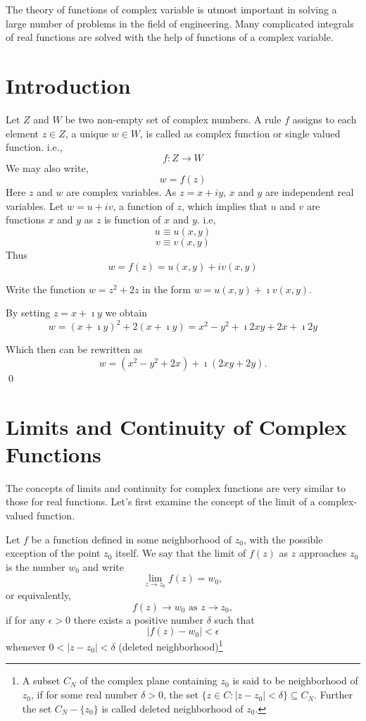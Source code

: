The theory of functions of complex variable is utmost important in solving a large number of problems in the field of engineering. Many complicated integrals of real functions are solved with the help of functions of a complex variable. 
\section{Introduction}
Let $Z$ and $W$ be two non-empty set of complex numbers. A rule $f$ assigns to each element $z \in Z$, a unique $w \in W$, is called as complex function or single valued function. i.e.,
\[f: Z \rightarrow W\]
We may also write,
\[w = f(z)\]
Here $z$ and $w$ are complex variables. As $z = x+iy$, $x$ and $y$ are independent real variables.
Let $w=u+iv$, a function of $z$, which implies that $u$ and $v$ are functions $x$ and $y$ as $z$ is  function of $x$ and $y$. i.e, 
\[ u \equiv u(x,y) \]
\[ v \equiv v(x,y) \]
Thus 
\[ w = f(z) = u(x,y)+iv(x,y) \]

\begin{example}
Write the function $w = z^2 + 2z$ in the form $w = u(x,y) + \imath v(x,y)$.

By setting $z = x + \imath y$ we obtain
\[w = (x + \imath y)^2 + 2(x + \imath y) = x^2-y^2 + \imath2xy + 2x + \imath2y\]

Which then can be rewritten as
\[w = (x^2 - y^2 + 2x) + \imath (2xy + 2y).\]
\qed
\end{example}



\section{Limits and Continuity of Complex Functions}

The concepts of limits and continuity for complex functions are very similar to those for real functions.  Let's first examine the concept of the limit of a complex-valued function.

\begin{definition}[Limit]
\label{def:limit}
Let $f$ be a function defined in some neighborhood of $z_0$, with the possible exception of the point $z_0$ itself.  We say that the limit of $f(z)$ as $z$ approaches $z_0$ is the number $w_0$ and write $$\lim_{z \to z_0} f(z) = w_0,$$ or equivalently,
\[f(z) \rightarrow w_0 \text{ as } z \rightarrow z_0,\]
if for any $\epsilon > 0$ there exists a positive number $\delta$ such that
\[ \left|f(z)-w_0\right|<\epsilon\] whenever $0<\left|z-z_0\right|<\delta$
(deleted neighborhood)\footnote{A subset $C_N$ of the complex plane containing $z_0$ is said to be neighborhood of $z_0$, if for some real number $\delta>0$, the set $\{z\in C:|z-z_0|<\delta\} \subseteq C_N$. Further the set $C_N-\{z_0\}$ is called deleted neighborhood of $z_0$.}

\end{definition}

